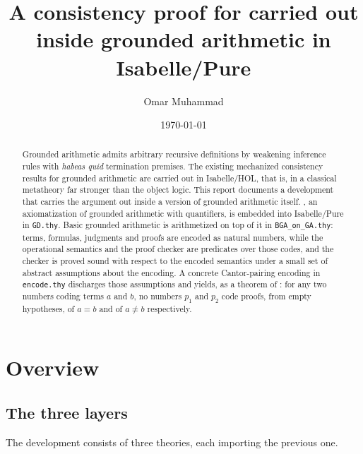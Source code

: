 \documentclass[11pt]{article}
\title{\bfseries A consistency proof for \BGA{} carried out inside grounded
       arithmetic in Isabelle/Pure}
\author{Omar Muhammad}
\date{\today}
\begin{document}
\maketitle

\begin{abstract}
\noindent
Grounded arithmetic admits arbitrary recursive definitions by weakening
inference rules with \emph{habeas quid} termination premises.  The existing
mechanized consistency results for grounded arithmetic are carried out in
Isabelle/HOL, that is, in a classical metatheory far stronger than the object
logic.  This report documents a development that carries the argument out
inside a version of grounded arithmetic itself.  \QGA, an axiomatization of grounded
arithmetic with quantifiers, is embedded into
Isabelle/Pure in \texttt{GD.thy}.  Basic grounded arithmetic \BGA{} is
arithmetized on top of it in \texttt{BGA\_on\_GA.thy}: terms, formulas,
judgments and proofs are encoded as \QGA{} natural numbers, while the
operational semantics and the proof checker are \QGA{} predicates over those
codes, and the checker is proved sound with respect to the encoded semantics
under a small set of abstract assumptions about the encoding.
A concrete Cantor-pairing encoding in \texttt{encode.thy} discharges those
assumptions and yields, as a theorem of \QGA: for any two numbers
coding \BGA{} terms $a$ and $b$, no numbers $p_1$ and $p_2$ code \BGA{} proofs, from
empty hypotheses, of $a = b$ and of $a \neq b$ respectively.
\end{abstract}

\tableofcontents

\section{Overview}
\label{sec:overview}

\subsection{The three layers}

The development consists of three theories, each importing the previous one.
\end{document}
